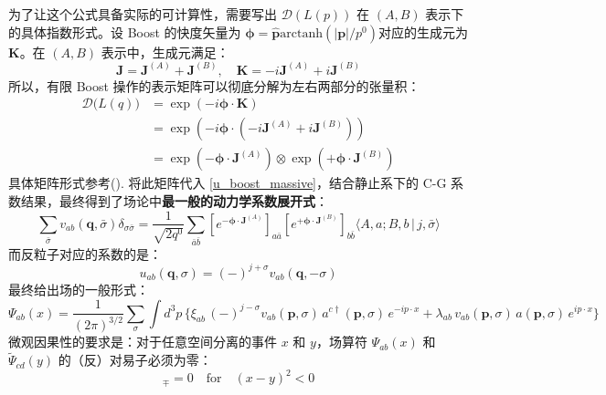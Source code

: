 为了让这个公式具备实际的可计算性，需要写出 $\mathscr{D}(L(p))$ 在 $(A,B)$ 表示下的具体指数形式。设 Boost 的快度矢量为 $\boldsymbol{\phi} = \hat{\boldsymbol{p}} \text{arctanh}(|\boldsymbol{p}|/p^0)$对应的生成元为 $\boldsymbol{K}$。在 $(A,B)$ 表示中，生成元满足：
\begin{equation}
    \boldsymbol{J} = \boldsymbol{J}^{(A)} + \boldsymbol{J}^{(B)}, \quad \boldsymbol{K} = -i\boldsymbol{J}^{(A)} + i\boldsymbol{J}^{(B)}
\end{equation}
所以，有限 Boost 操作的表示矩阵可以彻底分解为左右两部分的张量积：
\begin{align}
    \mathscr{D}\bigl(L(q)\bigr) &= \exp\left( -i \boldsymbol{\phi} \cdot \boldsymbol{K} \right) \nonumber \\
    &= \exp\left( -i \boldsymbol{\phi} \cdot (-i\boldsymbol{J}^{(A)} + i\boldsymbol{J}^{(B)}) \right) \nonumber \\
    &= \exp\left( -\boldsymbol{\phi} \cdot \boldsymbol{J}^{(A)} \right) \otimes \exp\left( +\boldsymbol{\phi} \cdot \boldsymbol{J}^{(B)} \right)
\end{align}
具体矩阵形式参考().
将此矩阵代入 \eqref{u_boost_massive}，结合静止系下的 C-G 系数结果，最终得到了场论中\textbf{最一般的动力学系数展开式}：
\begin{equation}
   \sum_{\bar{\sigma}} v_{ab}(\boldsymbol{q}, \bar{\sigma}) \delta_{\sigma\bar{\sigma}}= \frac{1}{\sqrt{2q^0}} \sum_{\bar{a}\bar{b}} \left[ e^{-\boldsymbol{\phi} \cdot \boldsymbol{J}^{(A)}} \right]_{a\bar{a}} \left[ e^{+\boldsymbol{\phi} \cdot \boldsymbol{J}^{(B)}} \right]_{b\bar{b}} \langle A,a; B,b \,|\, j,\bar{\sigma} \rangle
\end{equation}
而反粒子对应的系数的是：
\begin{equation}
    u_{ab}(\boldsymbol{q}, \sigma)=(-)^{j+\sigma}v_{ab}(\boldsymbol{q}, -\sigma)
\end{equation}
最终给出场的一般形式：
\begin{equation}
  \Psi_{ab}(x) = \frac{1}{(2\pi)^{3/2}}\sum_{\sigma}\int d^{3}p\,
  \bigl\{\xi_{ab}\,(-)^{j-\sigma}v_{ab}(\boldsymbol{p}, \sigma)\,a^{c\dagger}(\boldsymbol{p},\sigma)\,e^{-ip\cdot x}
  + \lambda_{ab}\,v_{ab}(\boldsymbol{p},\sigma)\,a(\boldsymbol{p},\sigma)\,e^{ip\cdot x}\bigr\}
\end{equation}
微观因果性的要求是：对于任意空间分离的事件 $x$ 和 $y$，场算符 $\Psi_{ab}(x)$ 和 $\widetilde{\Psi}_{cd}(y)$ 的（反）对易子必须为零：
\begin{equation}
    [\Psi_{ab}(x), \widetilde{\Psi}_{cd}^{\dagger}(y)]_{\mp} = 0 \quad \text{for} \quad (x-y)^2 < 0
\end{equation}  
